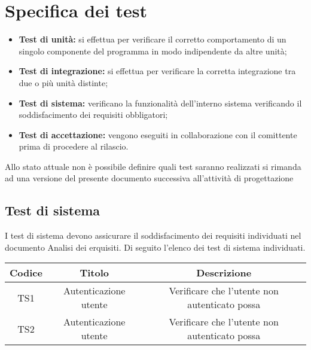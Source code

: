 \section{Specifica dei test}
\begin{itemize}
    \item \textbf{Test di unità:} si effettua per verificare il corretto comportamento di un singolo componente del programma in modo indipendente da altre unità;
    \item \textbf{Test di integrazione:} si effettua per verificare la corretta integrazione tra due o più unità distinte;
    \item \textbf{Test di sistema:} verificano la funzionalità dell'interno sistema verificando il soddisfacimento dei requisiti obbligatori;
    \item \textbf{Test di accettazione:} vengono eseguiti in collaborazione con il comittente prima di procedere al rilascio.
\end{itemize}

Allo stato attuale non è possibile definire quali test saranno realizzati si rimanda ad una versione del presente documento successiva all'attività di progettazione


\subsection{Test di sistema}

I test di sistema devono assicurare il soddisfacimento dei requisiti individuati nel documento Analisi dei erquisiti. 
Di seguito l'elenco dei test di sistema individuati.

\begin{center}
	\begin{longtable}{|c|c|c|}
	\hline
	\rowcolor{lighter-grayer}
	\textbf{Codice} & \textbf{Titolo} & \textbf{Descrizione} \\
	\hline
	\endfirsthead



	\hline
	TS1 & Autenticazione utente & Verificare che l'utente non autenticato possa  \\
	TS2 & Autenticazione utente & Verificare che l'utente non autenticato possa  \\

	\hline

	\end{longtable}
\end{center}

